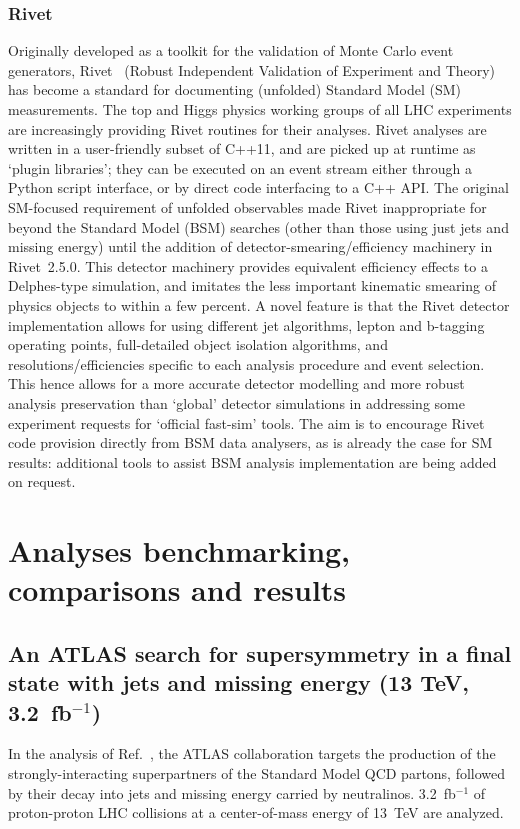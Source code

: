 \documentclass[11pt]{cernrep}
\begin{document}
\subsubsection{Rivet}
Originally developed as a toolkit for the validation of Monte Carlo event
generators, Rivet~\cite{Waugh:2006ip,Buckley:2010ar} (Robust Independent Validation of Experiment and
Theory) has become a standard for documenting (unfolded) Standard Model (SM)
measurements. The top and Higgs physics working groups of all LHC experiments
are increasingly providing Rivet routines for their analyses. Rivet analyses are
written in a user-friendly subset of C++11, and are picked up at runtime as
`plugin libraries'; they can be executed on an event stream either through a Python script interface, or by direct code interfacing to a C++ API.
The original SM-focused requirement of unfolded observables made Rivet
inappropriate for beyond the Standard Model (BSM) searches (other than those
using just jets and missing energy) until the addition of
detector-smearing/efficiency machinery in Rivet~2.5.0. This detector machinery provides equivalent efficiency effects to a Delphes-type simulation, and imitates the less important kinematic smearing of physics objects to within a few percent. A novel feature is that the Rivet detector implementation allows for using
different jet algorithms, lepton and b-tagging operating points, full-detailed object isolation algorithms, and resolutions/efficiencies specific to each
analysis procedure and event selection. This hence allows for a more accurate detector modelling and more robust analysis preservation than `global' detector simulations in addressing some experiment requests for `official fast-sim' tools. The aim is to encourage Rivet code provision directly from BSM data analysers, as is already the case for SM results: additional tools to assist BSM analysis implementation are being added on request.

\section{Analyses benchmarking, comparisons and results}

\subsection{An ATLAS search for supersymmetry in a final
state with jets and missing energy (13 TeV, 3.2~fb$^{-1}$)}

In the analysis of Ref.~\cite{Aaboud:2016zdn}, the ATLAS collaboration targets
the production of the strongly-interacting superpartners of the Standard Model
QCD partons, followed by their decay into jets and missing energy carried by
neutralinos. 3.2~fb$^{-1}$ of proton-proton LHC collisions at a center-of-mass
energy of 13~TeV are analyzed.
\end{document}
